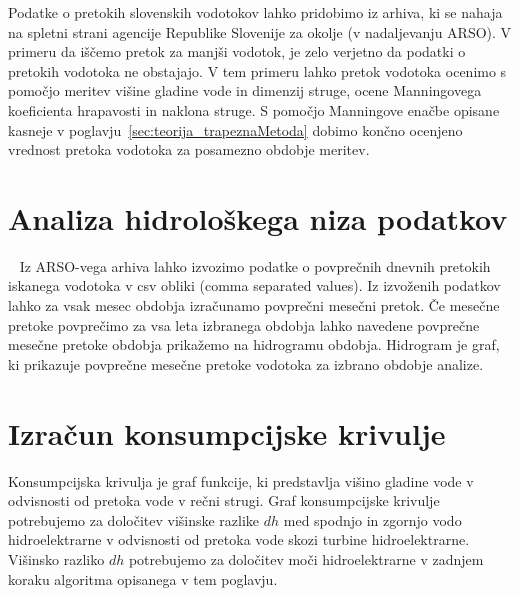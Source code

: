  
 
  Podatke o pretokih slovenskih vodotokov lahko pridobimo iz arhiva, ki se nahaja na spletni strani agencije Republike Slovenije za okolje (v nadaljevanju ARSO). V primeru da iščemo pretok za manjši vodotok, je zelo verjetno da podatki o pretokih vodotoka ne obstajajo. V tem primeru lahko pretok vodotoka ocenimo s pomočjo meritev višine gladine vode in dimenzij struge, ocene Manningovega koeficienta hrapavosti in naklona struge. S pomočjo Manningove enačbe opisane kasneje v poglavju~\ref{sec:teorija_trapeznaMetoda} dobimo končno ocenjeno vrednost pretoka vodotoka za posamezno obdobje meritev.




\section{Analiza hidrološkega niza podatkov}~\label{sec:teorija_hidrogramObdobja}
Iz ARSO-vega arhiva lahko izvozimo podatke o povprečnih dnevnih pretokih iskanega vodotoka v csv obliki (comma separated values). Iz izvoženih podatkov lahko za vsak mesec obdobja izračunamo povprečni mesečni pretok. Če mesečne pretoke povprečimo za vsa leta izbranega obdobja lahko navedene povprečne mesečne pretoke obdobja prikažemo na hidrogramu obdobja. Hidrogram je graf, ki prikazuje povprečne mesečne pretoke vodotoka za izbrano obdobje analize.  %




\section{Izračun konsumpcijske krivulje}
Konsumpcijska krivulja je graf funkcije, ki predstavlja višino gladine vode v odvisnosti od pretoka vode v rečni strugi. Graf konsumpcijske krivulje potrebujemo za določitev višinske razlike $dh$ med spodnjo in zgornjo vodo hidroelektrarne v odvisnosti od pretoka vode skozi turbine hidroelektrarne. Višinsko razliko $dh$ potrebujemo za določitev moči hidroelektrarne v zadnjem koraku algoritma opisanega v tem poglavju.



